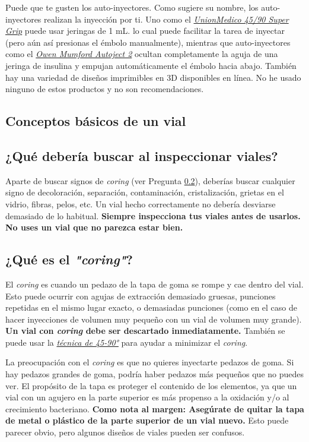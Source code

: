 \documentclass{article}
\begin{document}
Puede que te gusten los auto-inyectores. Como sugiere su nombre, los auto-inyectores realizan la inyección por ti. Uno como el \href{https://unionmedico.com/90-super-grip/}{\textit{UnionMedico 45/90 Super Grip}} puede usar jeringas de 1 mL. lo cual puede facilitar la tarea de inyectar (pero aún así presionas el émbolo manualmente), mientras que auto-inyectores como el \href{https://www.youtube.com/watch?v=hPbhEpUN43Y}{\textit{Owen Mumford Autoject 2}} ocultan completamente la aguja de una jeringa de insulina y empujan automáticamente el émbolo hacia abajo. También hay una variedad de diseños imprimibles en 3D disponibles en línea. No he usado ninguno de estos productos y no son recomendaciones.

\subsection*{Conceptos básicos de un vial}

\subsection{¿Qué debería buscar al inspeccionar viales?}

Aparte de buscar signos de \textit{coring} (ver Pregunta \ref{5-23}), deberías buscar cualquier signo de decoloración, separación, contaminación, cristalización, grietas en el vidrio, fibras, pelos, etc. Un vial hecho correctamente no debería desviarse demasiado de lo habitual. \textbf{Siempre inspecciona tus viales antes de usarlos. No uses un vial que no parezca estar bien.}

\subsection{¿Qué es el \textit{"coring"}?}\label{5-23}

El \textit{coring} es cuando un pedazo de la tapa de goma se rompe y cae dentro del vial. Esto puede ocurrir con agujas de extracción demasiado gruesas, punciones repetidas en el mismo lugar exacto, o demasiadas punciones (como en el caso de hacer inyecciones de volumen muy pequeño con un vial de volumen muy grande). \textbf{Un vial con \textit{coring} debe ser descartado inmediatamente.} También se puede usar la \href{https://www.youtube.com/watch?v=w5F0SLoMjC8}{\textit{técnica de 45-90°}} para ayudar a minimizar el \textit{coring}.

La preocupación con el \textit{coring} es que no quieres inyectarte pedazos de goma. Si hay pedazos grandes de goma, podría haber pedazos más pequeños que no puedes ver. El propósito de la tapa es proteger el contenido de los elementos, ya que un vial con un agujero en la parte superior es más propenso a la oxidación y/o al crecimiento bacteriano. \textbf{Como nota al margen: Asegúrate de quitar la tapa de metal o plástico de la parte superior de un vial nuevo.} Esto puede parecer obvio, pero algunos diseños de viales pueden ser confusos.
\end{document}
